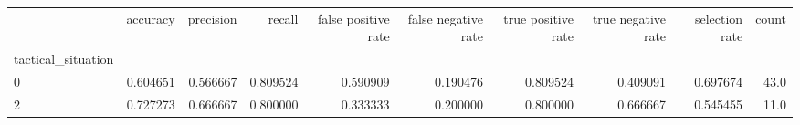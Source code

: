 \begin{tabular}{lrrrrrrrrr}
\toprule
{} &  accuracy &  precision &    recall &  false positive rate &  false negative rate &  true positive rate &  true negative rate &  selection rate &  count \\
tactical\_situation &           &            &           &                      &                      &                     &                     &                 &        \\
\midrule
0                  &  0.604651 &   0.566667 &  0.809524 &             0.590909 &             0.190476 &            0.809524 &            0.409091 &        0.697674 &   43.0 \\
2                  &  0.727273 &   0.666667 &  0.800000 &             0.333333 &             0.200000 &            0.800000 &            0.666667 &        0.545455 &   11.0 \\
\bottomrule
\end{tabular}
